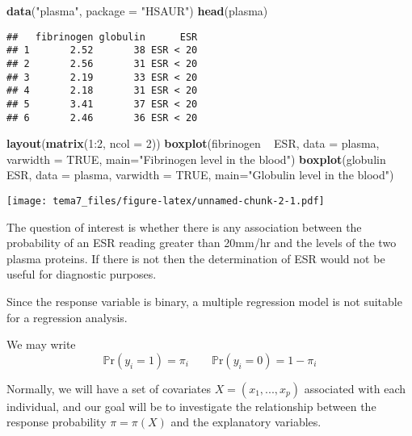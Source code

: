 \documentclass[]{article}
\newenvironment{Shaded}{\begin{snugshade}}{\end{snugshade}}
\newcommand{\KeywordTok}[1]{\textcolor[rgb]{0.13,0.29,0.53}{\textbf{{#1}}}}
\newcommand{\DataTypeTok}[1]{\textcolor[rgb]{0.13,0.29,0.53}{{#1}}}
\newcommand{\DecValTok}[1]{\textcolor[rgb]{0.00,0.00,0.81}{{#1}}}
\newcommand{\StringTok}[1]{\textcolor[rgb]{0.31,0.60,0.02}{{#1}}}
\newcommand{\OtherTok}[1]{\textcolor[rgb]{0.56,0.35,0.01}{{#1}}}
\newcommand{\NormalTok}[1]{{#1}}
\numberwithin{equation}{section}
\begin{document}
\begin{Shaded}
\begin{Highlighting}[]
\KeywordTok{data}\NormalTok{(}\StringTok{"plasma"}\NormalTok{, }\DataTypeTok{package =} \StringTok{"HSAUR"}\NormalTok{)}
\KeywordTok{head}\NormalTok{(plasma)}
\end{Highlighting}
\end{Shaded}

\begin{verbatim}
##   fibrinogen globulin      ESR
## 1       2.52       38 ESR < 20
## 2       2.56       31 ESR < 20
## 3       2.19       33 ESR < 20
## 4       2.18       31 ESR < 20
## 5       3.41       37 ESR < 20
## 6       2.46       36 ESR < 20
\end{verbatim}

\begin{Shaded}
\begin{Highlighting}[]
\KeywordTok{layout}\NormalTok{(}\KeywordTok{matrix}\NormalTok{(}\DecValTok{1}\NormalTok{:}\DecValTok{2}\NormalTok{, }\DataTypeTok{ncol =} \DecValTok{2}\NormalTok{))}
\KeywordTok{boxplot}\NormalTok{(fibrinogen ~}\StringTok{ }\NormalTok{ESR, }\DataTypeTok{data =} \NormalTok{plasma, }\DataTypeTok{varwidth =} \OtherTok{TRUE}\NormalTok{, }\DataTypeTok{main=}\StringTok{"Fibrinogen level in the blood"}\NormalTok{)}
\KeywordTok{boxplot}\NormalTok{(globulin ~}\StringTok{ }\NormalTok{ESR, }\DataTypeTok{data =} \NormalTok{plasma, }\DataTypeTok{varwidth =} \OtherTok{TRUE}\NormalTok{, }\DataTypeTok{main=}\StringTok{"Globulin level in the blood"}\NormalTok{)}
\end{Highlighting}
\end{Shaded}

\texttt{[image: tema7\_files/figure-latex/unnamed-chunk-2-1.pdf]}

The question of interest is whether there is any association between the
probability of an ESR reading greater than 20mm/hr and the levels of the
two plasma proteins. If there is not then the determination of ESR would
not be useful for diagnostic purposes.

Since the response variable is binary, a multiple regression model is
not suitable for a regression analysis.

We may write \[
\mathbb{P}\mbox{r}(y_i=1)=\pi_i \qquad \mathbb{P}\mbox{r}(y_i=0)=1-\pi_i
\]

Normally, we will have a set of covariates \(X=(x_1,..., x_p)\)
associated with each individual, and our goal will be to investigate the
relationship between the response probability \(\pi=\pi(X)\) and the
explanatory variables.
\end{document}
